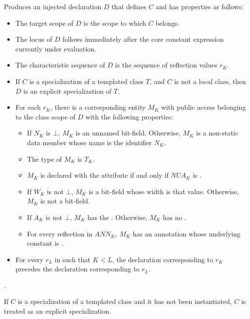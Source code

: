 \begin{itemdescr}
\pnum
\effects
Produces an injected declaration $D$
that defines $C$ and has properties as follows:
\begin{itemize}
\item
  The target scope of $D$
  is the scope to which $C$ belongs.
\item
  The locus of $D$
  follows immediately after the core constant expression
  currently under evaluation.
\item
  The characteristic sequence of $D$
  is the sequence of reflection values $r_K$.
\item
  If $C$ is a specialization of a templated class $T$,
  and $C$ is not a local class,
  then $D$ is an explicit specialization of $T$.
\item
  For each $r_K$,
  there is a corresponding entity $M_K$
  with public access
  belonging to the class scope of $D$
  with the following properties:
  \begin{itemize}
  \item
    If $N_K$ is $\bot$,
    $M_K$ is an unnamed bit-field.
    Otherwise, $M_K$ is a non-static data member whose name is the identifier
    $N_K$.
  \item
    The type of $M_K$ is $T_K$.
  \item
    $M_K$ is declared with the attribute 
    if and only if $\mathit{NUA}_K$ is .
  \item
    If $W_K$ is not $\bot$,
    $M_K$ is a bit-field whose width is that value.
    Otherwise, $M_K$ is not a bit-field.
  \item
    If $A_K$ is not $\bot$,
    $M_K$ has the  .
    Otherwise, $M_K$ has no .
  \item
    For every reflection  in $\mathit{ANN}_K$,
    $M_K$ has an annotation
    whose underlying constant is .
  \end{itemize}
  \item
    For every $r_L$ in  such that $K < L$,
    the declaration corresponding to $r_K$
    precedes the declaration corresponding to $r_L$.
\end{itemize}

\pnum
\returns
{}.

\pnum
\remarks
If $C$ is a specialization of a templated class and
it has not been instantiated,
$C$ is treated as an explicit specialization.
\end{itemdescr}

